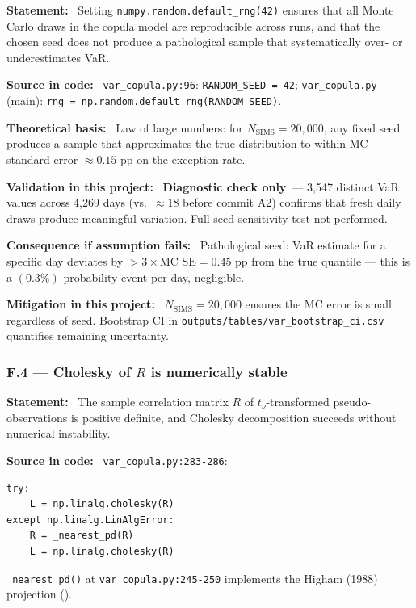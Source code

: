 \documentclass[11pt,a4paper]{article}
\newcommand{\asmfield}[1]{\medskip\noindent\textbf{#1:}\ }
\newcommand{\code}[1]{\texttt{#1}}
\newcommand{\diagnostic}{\textbf{Diagnostic check only}}
\begin{document}
\asmfield{Statement}
Setting \code{numpy.random.default\_rng(42)} ensures that all Monte Carlo
draws in the copula model are reproducible across runs, and that the chosen
seed does not produce a pathological sample that systematically over- or
underestimates VaR.

\asmfield{Source in code}
\code{var\_copula.py:96}: \lstinline|RANDOM_SEED = 42|;
\code{var\_copula.py} (main): \lstinline|rng = np.random.default_rng(RANDOM_SEED)|.

\asmfield{Theoretical basis}
Law of large numbers: for $N_{\mathrm{SIMS}} = 20{,}000$, any fixed seed
produces a sample that approximates the true distribution to within MC
standard error $\approx 0.15$ pp on the exception rate.

\asmfield{Validation in this project}
\diagnostic\ --- 3{,}547 distinct VaR values across 4{,}269 days (vs.\
$\approx 18$ before commit A2) confirms that fresh daily draws produce
meaningful variation. Full seed-sensitivity test not performed.

\asmfield{Consequence if assumption fails}
Pathological seed: VaR estimate for a specific day deviates by
$> 3 \times \text{MC SE} = 0.45$ pp from the true quantile --- this is a
$(0.3\%)$ probability event per day, negligible.

\asmfield{Mitigation in this project}
$N_{\mathrm{SIMS}} = 20{,}000$ ensures the MC error is small regardless
of seed. Bootstrap CI in \code{outputs/tables/var\_bootstrap\_ci.csv}
quantifies remaining uncertainty.

\subsubsection{F.4 --- Cholesky of $R$ is numerically stable}\label{asm:F4}

\asmfield{Statement}
The sample correlation matrix $R$ of $t_\nu$-transformed pseudo-observations
is positive definite, and Cholesky decomposition succeeds without numerical
instability.

\asmfield{Source in code}
\code{var\_copula.py:283-286}:
\begin{lstlisting}
try:
    L = np.linalg.cholesky(R)
except np.linalg.LinAlgError:
    R = _nearest_pd(R)
    L = np.linalg.cholesky(R)
\end{lstlisting}
\code{\_nearest\_pd()} at \code{var\_copula.py:245-250} implements the
Higham (1988) projection (\cite{Higham1988}).
\end{document}
